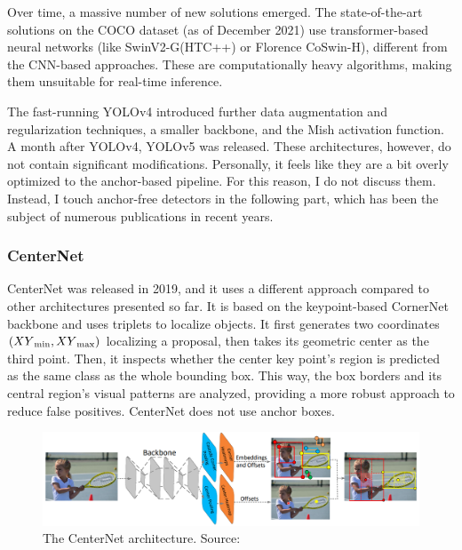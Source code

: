 Over time, a massive number of new solutions emerged. The state-of-the-art solutions on the COCO dataset (as of December 2021) use transformer-based neural networks (like SwinV2-G(HTC++) or Florence CoSwin-H), different from the CNN-based approaches. These are computationally heavy algorithms, making them unsuitable for real-time inference.

The fast-running YOLOv4\cite{YOLOv4} introduced further data augmentation and regularization techniques, a smaller backbone, and the Mish activation function. A month after YOLOv4, YOLOv5\cite{YOLOv5} was released. These architectures, however, do not contain significant modifications. Personally, it feels like they are a bit overly optimized to the anchor-based pipeline. For this reason, I do not discuss them. Instead, I touch anchor-free detectors in the following part, which has been the subject of numerous publications in recent years.

\subsubsection{CenterNet}

CenterNet\cite{CenterNet} was released in 2019, and it uses a different approach compared to other architectures presented so far. It is based on the keypoint-based CornerNet backbone and uses triplets to localize objects. It first generates two coordinates \((XY\textsubscript{min}, XY\textsubscript{max})\) localizing a proposal, then takes its geometric center as the third point. Then, it inspects whether the center key point's region is predicted as the same class as the whole bounding box. This way, the box borders and its central region's visual patterns are analyzed, providing a more robust approach to reduce false positives. CenterNet does not use anchor boxes.

\begin{figure}[htb]
 \centerline{\includegraphics[width=1.0\columnwidth]{.//Figure/Detector/CenterNet.png}}
 \caption{The CenterNet architecture. Source: \cite{CenterNet}}
 \label{fig:CenterNet}
\end{figure}

